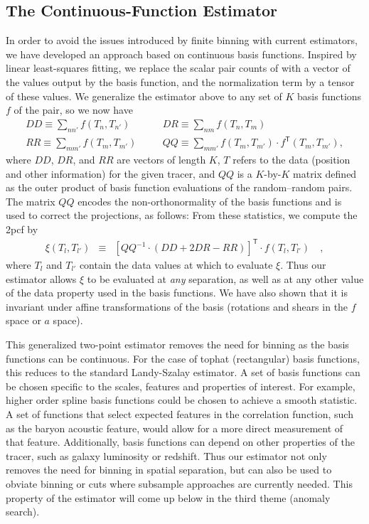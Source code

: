 \documentclass[12pt, fullpage, letterpaper]{article}
\newcommand{\cf}{2pcf\xspace}
\newcommand{\LS}{\acronym{LS}\xspace}
\newcommand{\inv}{^{-1}}
\newcommand{\T}{^{\mathsf{T}}}
\begin{document}
\subsection{The Continuous-Function Estimator}

In order to avoid the issues introduced by finite binning with current estimators, we have developed an approach based on continuous basis functions. 
Inspired by linear least-squares fitting, we replace the scalar pair counts of \LS with a vector of the values output by the basis function, and the normalization term by a tensor of these values.
We generalize the \LS estimator above to any set of $K$ basis functions $f$ of the pair, so we now have
\begin{eqnarray}\displaystyle
DD \equiv \sum_{n n'} f(T_n, T_{n'}) &\quad&
DR \equiv \sum_{n m} f(T_n, T_{m}) \nonumber\\
RR \equiv \sum_{m m'} f(T_m, T_{m'}) &\quad&
QQ \equiv \sum_{m m'} f(T_m, T_{m'}) \cdot f\T(T_m, T_{m'}),
\end{eqnarray}
where $DD$, $DR$, and $RR$ are vectors of length $K$, $T$ refers to the data (position and other information) for the given tracer, and $QQ$ is a $K$-by-$K$ matrix defined as the outer product of basis function evaluations of the random--random pairs.
The matrix $QQ$ encodes the non-orthonormality of the basis functions and is used to correct the projections, as follows:
From these statistics, we compute the \cf by
\begin{eqnarray}\displaystyle
\xi(T_l, T_{l'}) &\equiv& [QQ\inv \cdot (DD + 2DR - RR)]\T \cdot f(T_l, T_{l'}) \quad ,
\end{eqnarray}
where $T_l$ and $T_{l'}$ contain the data values at which to evaluate $\xi$.
Thus our estimator allows $\xi$ to be evaluated at \emph{any} separation, as well as at any other value of the data property used in the basis functions.
We have also shown that it is invariant under affine transformations of the basis (rotations and shears in the $f$ space or $a$ space).

This generalized two-point estimator removes the need for binning as the basis functions can be continuous.
For the case of tophat (rectangular) basis functions, this reduces to the standard Landy-Szalay estimator.
A set of basis functions can be chosen specific to the scales, features and properties of interest.
For example, higher order spline basis functions could be chosen to achieve a smooth statistic. 
A set of functions that select expected features in the correlation function, such as the baryon acoustic feature, would allow for a more direct measurement of that feature.
Additionally, basis functions can depend on other properties of the tracer, such as galaxy luminosity or redshift.
Thus our estimator not only removes the need for binning in spatial separation, but can also be used to obviate binning or cuts where subsample approaches are currently needed.
This property of the estimator will come up below in the third theme (anomaly search).
\end{document}
